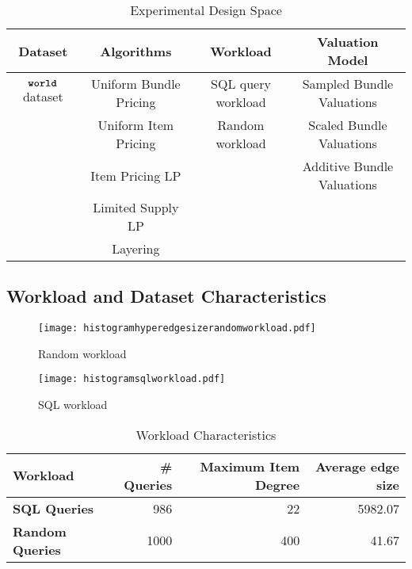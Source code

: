 \begin{table*} \centering
	\def\arraystretch{1.35}%
	\begin{tabular}{c|c|c|c}
		\toprule
		\textbf{Dataset} & \textbf{Algorithms} & \textbf{Workload} & \textbf{Valuation Model}\\ \midrule
		$\texttt{\bfseries world}$ dataset & Uniform Bundle Pricing & SQL query workload & Sampled Bundle Valuations \\ 
		& Uniform Item Pricing & Random workload & Scaled Bundle Valuations \\ 
		& Item Pricing LP &  & Additive Bundle Valuations \\ 
		& Limited Supply LP & &  \\
		& Layering &  &  \\
		\bottomrule
	\end{tabular}
	\caption{Experimental Design Space}
	\label{table:experiments}
\end{table*}

\subsection{Workload and Dataset Characteristics}

\begin{figure}[!h]
	
	\begin{minipage}[t]{0.49\linewidth}
		\centering
		\texttt{[image: histogramhyperedgesizerandomworkload.pdf]}
		\caption{Random workload} \label{fig:histogramrandom}
	\end{minipage}
	\begin{minipage}[t]{0.47\linewidth} 
		\centering
		\texttt{[image: histogramsqlworkload.pdf]}
		\caption{SQL workload} \label{fig:histogramrealqueries}
	\end{minipage}        
\end{figure}  

\begin{table*}[] \centering
	\begin{small}
		\begin{tabular}{@{}lrrr@{}}\toprule
			\textbf{Workload} & \textbf{\# Queries} & \textbf{Maximum Item Degree} & \textbf{Average edge size} \\ \midrule
			
			\textbf{SQL Queries} &  986 & 22 & 5982.07  \\ \hdashline
			\textbf{Random Queries} &  1000 & 400 &  41.67  \\
			\bottomrule
		\end{tabular}
	\end{small}
	\caption{Workload Characteristics}
	\label{table:workload:characteristics}
\end{table*}

